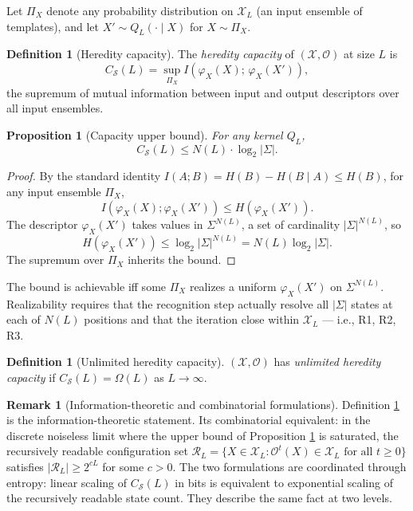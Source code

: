 \documentclass[11pt]{article}
\theoremstyle{plain}
\newtheorem{proposition}[theorem]{Proposition}
\theoremstyle{definition}
\newtheorem{definition}[theorem]{Definition}
\newtheorem{remark}[theorem]{Remark}
\newcommand{\Csub}{C_{\mathcal{S}}}
\newcommand{\descX}{\varphi_X}
\newcommand{\Xset}{\mathcal{X}}
\newcommand{\Op}{\mathcal{O}}
\newcommand{\Reach}{\mathcal{R}}
\begin{document}
Let $\Pi_X$ denote any probability distribution on $\Xset_L$ (an input ensemble of templates), and let $X' \sim Q_L(\cdot \mid X)$ for $X \sim \Pi_X$.

\begin{definition}[Heredity capacity]
\label{def:heredity_capacity}
The \emph{heredity capacity} of $(\Xset, \Op)$ at size $L$ is
\begin{equation}
\Csub(L) = \sup_{\Pi_X} I\!\left(\descX(X);\, \descX(X')\right),
\end{equation}
the supremum of mutual information between input and output descriptors over all input ensembles.
\end{definition}

\begin{proposition}[Capacity upper bound]
\label{prop:capacity_upper}
For any kernel $Q_L$,
\begin{equation}
\Csub(L) \le N(L) \cdot \log_2 |\Sigma|.
\end{equation}
\end{proposition}

\begin{proof}
By the standard identity $I(A; B) = H(B) - H(B \mid A) \le H(B)$, for any input ensemble $\Pi_X$,
\[
I(\descX(X); \descX(X')) \le H(\descX(X')).
\]
The descriptor $\descX(X')$ takes values in $\Sigma^{N(L)}$, a set of cardinality $|\Sigma|^{N(L)}$, so
\[
H(\descX(X')) \le \log_2 |\Sigma|^{N(L)} = N(L) \log_2 |\Sigma|.
\]
The supremum over $\Pi_X$ inherits the bound.
\end{proof}

The bound is achievable iff some $\Pi_X$ realizes a uniform $\descX(X')$ on $\Sigma^{N(L)}$. Realizability requires that the recognition step actually resolve all $|\Sigma|$ states at each of $N(L)$ positions and that the iteration close within $\Xset_L$ --- i.e., R1, R2, R3.

\begin{definition}[Unlimited heredity capacity]
\label{def:unlimited_heredity}
$(\Xset, \Op)$ has \emph{unlimited heredity capacity} if $\Csub(L) = \Omega(L)$ as $L \to \infty$.
\end{definition}

\begin{remark}[Information-theoretic and combinatorial formulations]
\label{rem:linear_exp}
Definition \ref{def:unlimited_heredity} is the information-theoretic statement. Its combinatorial equivalent: in the discrete noiseless limit where the upper bound of Proposition \ref{prop:capacity_upper} is saturated, the recursively readable configuration set $\Reach_L = \{X \in \Xset_L : \Op^t(X) \in \Xset_L \text{ for all } t \ge 0\}$ satisfies $|\Reach_L| \ge 2^{cL}$ for some $c > 0$. The two formulations are coordinated through entropy: linear scaling of $\Csub(L)$ in bits is equivalent to exponential scaling of the recursively readable state count. They describe the same fact at two levels.
\end{remark}
\end{document}
